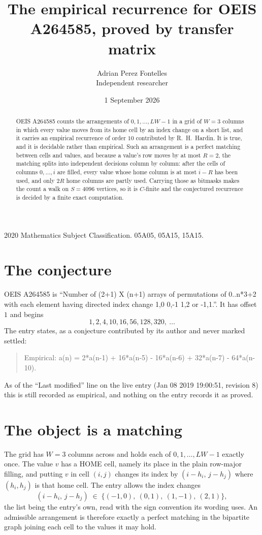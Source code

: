 \documentclass[11pt,a4paper]{article}
\title{The empirical recurrence for OEIS A264585, proved by transfer matrix}
\author{Adrian Perez Fontelles\\ \small Independent researcher}
\date{1 September 2026}
\theoremstyle{plain}
\theoremstyle{definition}
\begin{document}
\maketitle

\begin{abstract}
OEIS A264585 counts the arrangements of $0,1,\dots,LW-1$ in a grid of $W=3$ columns in which
every value moves from its home cell by an index change on a short list, and it carries an
empirical recurrence of order $10$ contributed by R.~H.~Hardin. It is true, and it is
decidable rather than empirical. Such an arrangement is a perfect matching between cells and
values, and because a value's row moves by at most $R=2$, the matching splits into
independent decisions column by column: after the cells of columns $0,\dots,i$ are filled,
every value whose home column is at most $i-R$ has been used, and only $2R$ home columns are
partly used. Carrying those as bitmasks makes the count a walk on $S=4096$ vertices, so it is
$C$-finite and the conjectured recurrence is decided by a finite exact computation.
\end{abstract}

\noindent\small 2020 Mathematics Subject Classification. 05A05, 05A15, 15A15.\normalsize

\section{The conjecture}

OEIS A264585 is ``Number of (2+1) X (n+1) arrays of permutations of 0..n*3+2 with each element having directed index change 1,0 0,-1 1,2 or -1,1.''. It has offset $1$ and begins
\[
1, 2, 4, 10, 16, 56, 128, 320,\ \dots
\]
The entry states, as a conjecture contributed by its author and never marked settled:
\begin{quote}
Empirical: a(n) = 2*a(n-1) + 16*a(n-5) - 16*a(n-6) + 32*a(n-7) - 64*a(n-10).
\end{quote}
As of the ``Last modified'' line on the live entry (Jan 08 2019 19:00:51, revision 8) this is still
recorded as empirical, and nothing on the entry records it as proved.

\section{The object is a matching}

The grid has $W=3$ columns across and holds each of $0,1,\dots,LW-1$ exactly once. The value
$v$ has a HOME cell, namely its place in the plain row-major filling, and putting $v$ in cell
$(i,j)$ changes its index by $(i-h_i,\,j-h_j)$ where $(h_i,h_j)$ is that home cell. The entry
allows the index changes
\[
(i-h_i,\,j-h_j)\;\in\;\{(-1,0),\ (0,1),\ (1,-1),\ (2,1)\},
\]
the list being the entry's own, read with the sign convention its wording uses. An admissible
arrangement is therefore exactly a perfect matching in the bipartite graph joining each cell to
the values it may hold.
\end{document}
